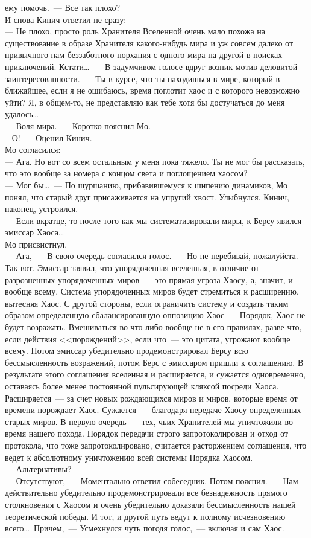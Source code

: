 ему помочь.~--- Все так плохо?\\
И снова Кинич ответил не сразу:\\
--- Не плохо, просто роль Хранителя Вселенной очень мало похожа на существование 
в образе Хранителя какого-нибудь мира и уж совсем далеко от привычного нам 
беззаботного порхания с одного мира на другой в поисках приключений. 
Кстати\ldots~--- В задумчивом голосе вдруг возник мотив деловитой заинтересованности.~--- Ты в 
курсе, что ты находишься в мире, который в ближайшее, если я не ошибаюсь, время 
поглотит хаос и с которого невозможно уйти? Я, в общем-то, не представляю как 
тебе хотя бы достучаться до меня удалось\ldots\\
--- Воля мира.~--- Коротко пояснил Мо.\\
-- О!~--- Оценил Кинич.\\
Мо согласился:\\
--- Ага. Но вот со всем остальным у меня пока тяжело. Ты не мог бы рассказать, 
что это вообще за номера с концом света и поглощением хаосом?\\
--- Мог бы\ldots~--- По шуршанию, прибавившемуся к шипению динамиков, Мо понял, 
что старый друг присаживается на упругий хвост. Улыбнулся. Кинич, наконец, 
устроился.\\
--- Если вкратце, то после того как мы систематизировали миры, к Берсу явился 
эмиссар Хаоса\ldots\\
Мо присвистнул.\\
--- Ага,~--- В свою очередь согласился голос.~--- Но не перебивай, пожалуйста. 
Так вот. Эмиссар заявил, что упорядоченная вселенная, в отличие от разрозненных 
упорядоченных миров~--- это прямая угроза Хаосу, а, значит, и вообще всему. 
Система упорядоченных миров будет стремиться к расширению, вытесняя Хаос. С 
другой стороны, если ограничить систему и создать таким образом определенную 
сбалансированную оппозицию Хаос~--- Порядок, Хаос не будет возражать. 
Вмешиваться во что-либо вообще не в его правилах, разве что, если действия <<порождений>>, 
если что~--- это цитата, угрожают вообще всему. Потом эмиссар убедительно 
продемонстрировал Берсу всю бессмысленность возражений, потом Берс с эмиссаром 
пришли к соглашению. В результате этого соглашения вселенная и расширяется, и 
сужается одновременно, оставаясь более менее постоянной пульсирующей кляксой 
посреди Хаоса. Расширяется~--- за счет новых рождающихся миров и миров, которые 
время от времени порождает Хаос. Сужается~--- благодаря передаче Хаосу 
определенных старых миров. В первую очередь~--- тех, чьих Хранителей мы 
уничтожили во время нашего похода. Порядок передачи строго запротоколирован и отход от 
протокола, что тоже запротоколировано, считается расторжением соглашения, что 
ведет к абсолютному уничтожению всей системы Порядка Хаосом.\\
--- Альтернативы?\\
--- Отсутствуют,~--- Моментально ответил собеседник. Потом пояснил.~--- Нам 
действительно убедительно продемонстрировали все безнадежность прямого 
столкновения с Хаосом и очень убедительно доказали бессмысленность нашей 
теоретической победы. И тот, и другой путь ведут к полному исчезновению 
всего\ldots\ Причем,~--- Усмехнулся чуть погодя голос,~--- включая и сам Хаос.

